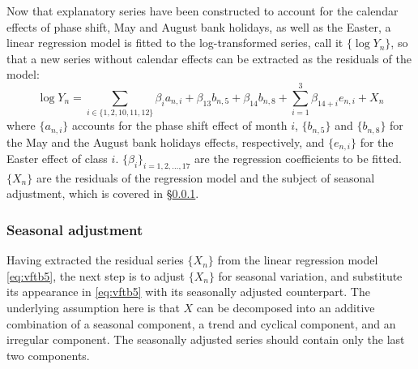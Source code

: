 \documentclass[a4paper,11pt,pdftex,twoside,titlepage]{article}
\begin{document}
Now that explanatory series have been constructed to account for the
calendar effects of phase shift, May and August bank holidays, as well
as the Easter, a linear regression model is fitted to the
log-transformed series, call it $\{\log Y_n\}$, so that a new
series without calendar effects can be extracted as the residuals of
the model:
\begin{equation}
  \label{eq:vftb5}
  \log Y_n = \sum_{i \in \{1,2,10,11,12\}} \beta_i a_{n, i} +
  \beta_{13} b_{n, 5} + \beta_{14} b_{n, 8}
  + \sum_{i =1}^3 \beta_{14+i} e_{n, i} + X_n
\end{equation}
where $\{a_{n,i}\}$ accounts for the phase shift effect of month $i$,
$\{b_{n,5}\}$ and $\{b_{n,8}\}$ for the May and the August bank
holidays effects, respectively, and $\{e_{n,i}\}$ for the Easter effect of
class $i$. $\{\beta_i\}_{i=1,2,\dots,17}$ are the regression
coefficients to be fitted.  $\{X_n\}$ are the residuals of the
regression model and the subject of seasonal adjustment, which is
covered in \S\ref{sec:j98f4}.

\subsubsection{Seasonal adjustment}\label{sec:j98f4}
Having extracted the residual series $\{X_n\}$ from the linear regression
model \eqref{eq:vftb5}, the next step is to adjust $\{X_n\}$ for seasonal
variation, and substitute its appearance in \eqref{eq:vftb5} with its
seasonally adjusted counterpart. The underlying assumption here is that
$X$  can be decomposed into an additive combination of a seasonal
component, a trend and cyclical component, and an irregular
component. The seasonally adjusted series should contain only the last
two components.
\end{document}
